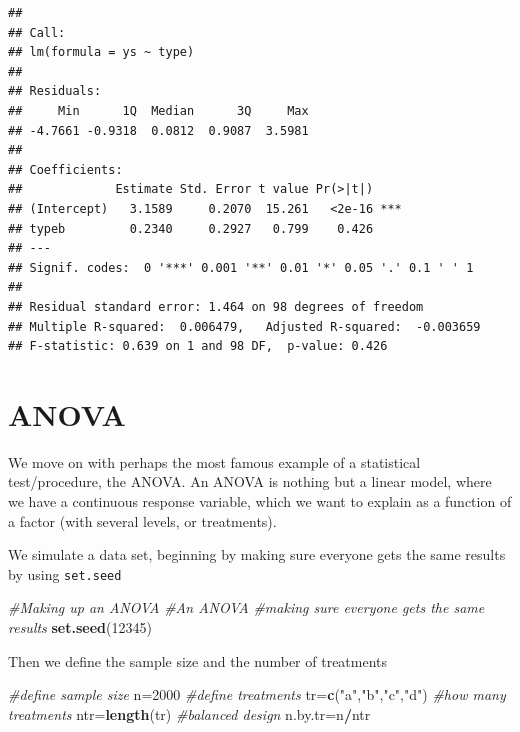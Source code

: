 \documentclass[
]{book}
\newenvironment{Shaded}{\begin{snugshade}}{\end{snugshade}}
\newcommand{\CommentTok}[1]{\textcolor[rgb]{0.56,0.35,0.01}{\textit{#1}}}
\newcommand{\DecValTok}[1]{\textcolor[rgb]{0.00,0.00,0.81}{#1}}
\newcommand{\KeywordTok}[1]{\textcolor[rgb]{0.13,0.29,0.53}{\textbf{#1}}}
\newcommand{\NormalTok}[1]{#1}
\newcommand{\OperatorTok}[1]{\textcolor[rgb]{0.81,0.36,0.00}{\textbf{#1}}}
\newcommand{\StringTok}[1]{\textcolor[rgb]{0.31,0.60,0.02}{#1}}
\begin{document}
\begin{verbatim}
## 
## Call:
## lm(formula = ys ~ type)
## 
## Residuals:
##     Min      1Q  Median      3Q     Max 
## -4.7661 -0.9318  0.0812  0.9087  3.5981 
## 
## Coefficients:
##             Estimate Std. Error t value Pr(>|t|)    
## (Intercept)   3.1589     0.2070  15.261   <2e-16 ***
## typeb         0.2340     0.2927   0.799    0.426    
## ---
## Signif. codes:  0 '***' 0.001 '**' 0.01 '*' 0.05 '.' 0.1 ' ' 1
## 
## Residual standard error: 1.464 on 98 degrees of freedom
## Multiple R-squared:  0.006479,	Adjusted R-squared:  -0.003659 
## F-statistic: 0.639 on 1 and 98 DF,  p-value: 0.426
\end{verbatim}

\hypertarget{anova}{%
\section{ANOVA}\label{anova}}

We move on with perhaps the most famous example of a statistical test/procedure, the ANOVA. An ANOVA is nothing but a linear model, where we have a continuous response variable, which we want to explain as a function of a factor (with several levels, or treatments).

We simulate a data set, beginning by making sure everyone gets the same results by using \texttt{set.seed}

\begin{Shaded}
\begin{Highlighting}[]
\CommentTok{#Making up an ANOVA}
\CommentTok{#An ANOVA}
\CommentTok{#making sure everyone gets the same results}
\KeywordTok{set.seed}\NormalTok{(}\DecValTok{12345}\NormalTok{)}
\end{Highlighting}
\end{Shaded}

Then we define the sample size and the number of treatments

\begin{Shaded}
\begin{Highlighting}[]
\CommentTok{#define sample size}
\NormalTok{n=}\DecValTok{2000}
\CommentTok{#define treatments}
\NormalTok{tr=}\KeywordTok{c}\NormalTok{(}\StringTok{"a"}\NormalTok{,}\StringTok{"b"}\NormalTok{,}\StringTok{"c"}\NormalTok{,}\StringTok{"d"}\NormalTok{)}
\CommentTok{#how many treatments}
\NormalTok{ntr=}\KeywordTok{length}\NormalTok{(tr)}
\CommentTok{#balanced design}
\NormalTok{n.by.tr=n}\OperatorTok{/}\NormalTok{ntr}
\end{Highlighting}
\end{Shaded}
\end{document}
